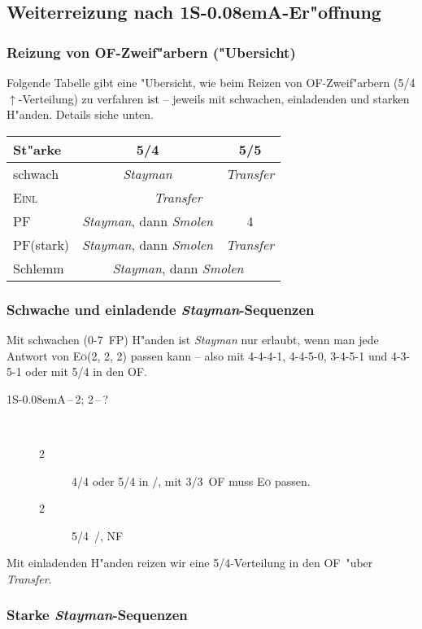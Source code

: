 \documentclass[11pt,german,twocolumn]{scrartcl}
\def\pik{\nobreak\hspace{\cardskip}\Sp\xspace}
\def\coe{\nobreak\hspace{\cardskip}\He\xspace}
\def\kar{\nobreak\hspace{\cardskip}\Di\xspace}
\def\tre{\nobreak\hspace{\cardskip}\Cl\xspace}
\def\pi{\Sp\xspace}
\def\co{\He\xspace}
\def\pl{$\uparrow$\xspace}
\def\ofa{\nobreak\textsf{OF}\xspace}
\def\sa{\nobreak\textsf{S\kern-0.08emA}\xspace}
\def\SA{\nobreak\hspace{\cardskip}\sa}
\def\sep{\,--\,}
\newcommand{\conv}[1]{\emph{#1}}
\def\pf{\textsc{PF}\xspace}
\def\inv{\textsc{Einl}\xspace}
\def\nf{\textsc{NF}\xspace}
\def\eo{\textsc{E\"o}\xspace}
\def\bdsc{\begin{description}}
\def\edsc{\end{description}}
\begin{document}
\subsection{Weiterreizung nach 1\SA-Er"offnung}

\subsubsection{Reizung von \ofa-Zweif"arbern ("Ubersicht)}

Folgende Tabelle gibt eine "Ubersicht, wie beim Reizen von
\ofa-Zweif"arbern (5/4\pl-Verteilung) zu verfahren ist -- jeweils mit
schwachen, einladenden und starken H"anden.  Details siehe unten.

\begin{tabular}[t]{|l|c|c|}
\hline
\textbf{St"arke} & \textbf{5/4} & \textbf{5/5}\\
\hline
\hline
schwach & \conv{Stayman} & \conv{Transfer}\\
\hline
\inv & \multicolumn{2}{c|}{\conv{Transfer}}\\
\hline
\pf & \conv{Stayman}, dann \conv{Smolen} & 4\kar\\
\hline
\pf (stark) & \conv{Stayman}, dann \conv{Smolen} & \conv{Transfer}\\
\hline
Schlemm & \multicolumn{2}{c|}{\conv{Stayman}, dann \conv{Smolen}}\\
\hline
\end{tabular}

\subsubsection{Schwache und einladende \conv{Stayman}-Sequenzen}

Mit schwachen (0-7~FP) H"anden ist \conv{Stayman} nur erlaubt, wenn
man jede Antwort von \eo (2\kar, 2\coe, 2\pik) passen kann -- also
mit 4-4-4-1, 4-4-5-0, 3-4-5-1 und 4-3-5-1 oder mit 5/4 in den \ofa.

\bdsc
\item[1\SA{}\sep2\tre; 2\kar{}\sep?]~
\bdsc
\item[2\coe] 4/4 oder 5/4 in \coe/\pi, mit 3/3~\ofa muss \eo passen.
\item[2\pik] 5/4~\pik/\co, \nf
\edsc
\edsc

Mit einladenden H"anden reizen wir eine 5/4-Verteilung in den \ofa\
"uber \conv{Transfer}.

\subsubsection{Starke \conv{Stayman}-Sequenzen}
\end{document}
